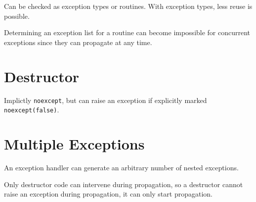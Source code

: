 \documentclass[11pt]{article}
\begin{document}
Can be checked as exception types or routines.
With exception types, less reuse is possible.

Determining an exception list for a routine can become impossible for concurrent exceptions since
they can propagate at any time.
\section{Destructor}
\label{sec:orgd187f80}
Implictly \texttt{noexcept}, but can raise an exception if explicitly marked \texttt{noexcept(false)}.
\section{Multiple Exceptions}
\label{sec:orgb950d10}
An exception handler can generate an arbitrary number of nested exceptions.

Only destructor code can intervene during propagation, so a destructor cannot raise an exception during
propagation, it can only start propagation.
\end{document}
